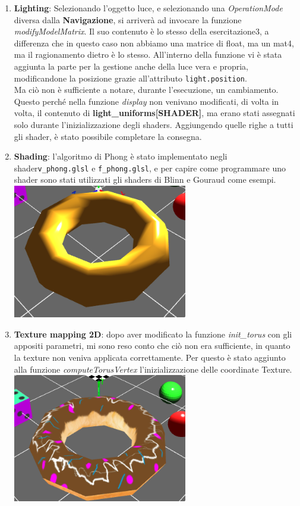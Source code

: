 \begin{enumerate}
    \item \textbf{Lighting}: Selezionando l'oggetto luce, e selezionando una \textit{OperationMode} diversa dalla \textbf{Navigazione}, si arriverà ad invocare la funzione \textit{modifyModelMatrix}. Il suo contenuto è lo stesso della esercitazione3, a differenza che in questo caso non abbiamo una matrice di float, ma un mat4, ma il ragionamento dietro è lo stesso. All'interno della funzione vi è stata aggiunta la parte per la gestione anche della luce vera e propria, modificandone la posizione grazie all'attributo \texttt{light.position}.\\ Ma ciò non è sufficiente a notare, durante l'esecuzione, un cambiamento. Questo perché nella funzione \textit{display} non venivano modificati, di volta in volta, il contenuto di \textbf{light\_uniforms[SHADER]}, ma erano stati assegnati solo durante l'inizializzazione degli shaders. Aggiungendo quelle righe a tutti gli shader, è stato possibile completare la consegna.
    \item \textbf{Shading}: l'algoritmo di Phong è stato implementato negli shader\texttt{v\_phong.glsl} e \texttt{f\_phong.glsl}, e per capire come programmare uno shader sono stati utilizzati gli shaders di Blinn e Gouraud come esempi.
    \\
           {\centering
\includegraphics[width=0.6\textwidth]{toroPhong.png}} 
    \item \textbf{Texture mapping 2D}: dopo aver modificato la funzione \textit{init\_torus} con gli appositi parametri, mi sono reso conto che ciò non era sufficiente, in quanto la texture non veniva applicata correttamente. Per questo è stato aggiunto alla funzione \textit{computeTorusVertex} l'inizializzazione delle coordinate Texture.
    \\
           {\centering
\includegraphics[width=0.6\textwidth]{toroTexture.png}} 

\end{enumerate}
